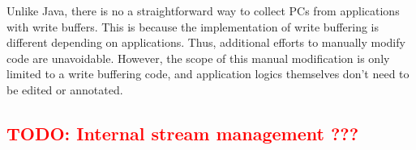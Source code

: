 Unlike Java, there is no a straightforward way to collect PCs from applications
with write buffers. This is because the implementation of write buffering is
different depending on applications. Thus, additional efforts to manually
modify code are unavoidable. However, the scope of this manual modification is
only limited to a write buffering code, and application logics themselves don't
need to be edited or annotated.



\subsection{\textcolor{red}{TODO: Internal stream management ???}}




